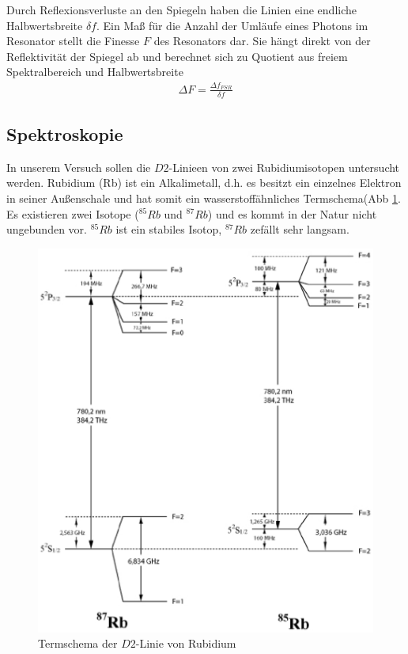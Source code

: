 \documentclass[12pt]{article}
\begin{document}
Durch Reflexionsverluste an den Spiegeln haben die Linien eine endliche Halbwertsbreite $\delta f$. Ein Maß für die Anzahl der Umläufe eines Photons im Resonator stellt die Finesse $F$ des Resonators dar. Sie hängt direkt von der Reflektivität der Spiegel ab und berechnet sich zu Quotient aus freiem Spektralbereich und Halbwertsbreite
\begin{align}
\label{finesse}
 \Delta F  = \frac{\Delta f_{FSR}}{\delta f}
\end{align}
\subsection{Spektroskopie}
In unserem Versuch sollen die $D2$-Linieen von zwei Rubidiumisotopen untersucht werden. Rubidium (Rb) ist ein Alkalimetall, d.h. es besitzt ein einzelnes Elektron in seiner Außenschale und hat somit ein wasserstoffähnliches Termschema(Abb \ref{term}. Es existieren zwei Isotope ($^{85}Rb$ und $^{87}Rb$) und es kommt in der Natur nicht ungebunden vor. $^{85}Rb$ ist ein stabiles Isotop, $^{87}Rb$ zefällt sehr langsam.
\begin{figure}[H]
 \includegraphics[width=0.9\linewidth]{pictures/term.eps}
 \caption{Termschema der $D2$-Linie von Rubidium}
 \label{term}
\end{figure}
\end{document}
